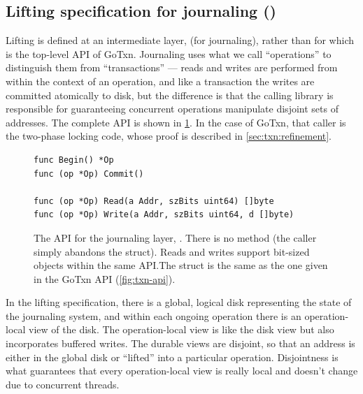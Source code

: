 \subsection{Lifting specification for journaling ()}
\label{sec:txn:lifting}

Lifting is defined at an intermediate layer,  (for journaling), rather
than for  which is the top-level API of GoTxn. Journaling uses what we
call ``operations'' to distinguish them from ``transactions'' --- reads and
writes are performed from within the context of an operation, and like a
transaction the writes are committed atomically to
disk, but the difference is that the calling library is responsible for guaranteeing
concurrent operations manipulate disjoint sets of addresses. The complete API is
shown in \cref{fig:jrnl-api}. In the case of GoTxn, that caller is
the two-phase locking code, whose proof is described in \cref{sec:txn:refinement}.

\begin{figure}[ht]
  \begin{verbatim}
func Begin() *Op
func (op *Op) Commit()

func (op *Op) Read(a Addr, szBits uint64) []byte
func (op *Op) Write(a Addr, szBits uint64, d []byte)
  \end{verbatim}
  \tightenspace
  \caption[API for the journaling layer.]{The API for the journaling layer, . There is no
     method (the caller simply abandons the  struct). Reads
    and writes support bit-sized objects within the same API.\@ The 
    struct is the same as the one given in the GoTxn API (\cref{fig:txn-api}).}
  \label{fig:jrnl-api}
\end{figure}

In the lifting specification, there is a global, logical disk representing the
state of the journaling system, and within each ongoing operation there is an
operation-local view of the disk. The operation-local view is like the disk
view but also incorporates buffered writes. The durable views are disjoint, so
that an address is either in the global disk or ``lifted'' into a particular
operation. Disjointness is what guarantees that every operation-local view is really local and
doesn't change due to concurrent threads.


